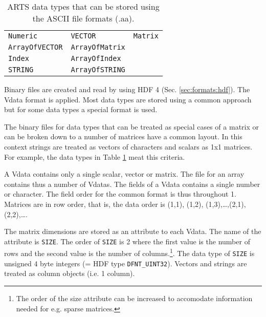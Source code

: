  \begin{table}[t]
  \begin{tabular}{p{4.5cm} p{4.5cm} p{4.5cm}}
   \verb|Numeric|        & \verb|VECTOR|         & \verb|Matrix|          \\
   \verb|ArrayOfVECTOR|  & \verb|ArrayOfMatrix|  &                        \\
   \verb|Index|          & \verb|ArrayOfIndex|  &                        \\
   \verb|STRING|          & \verb|ArrayOfSTRING|  &                        \\
  \end{tabular}
  \caption{ARTS data types that can be stored using the ASCII
           file formats (.aa).}
  \label{table:format:aa}
 \end{table}
 

 \label{sec:formats:file:binary}
  
 Binary files are created and read by using HDF 4 (Sec.
 \ref{sec:formats:hdf}). The Vdata format is applied. Most data types
 are stored using a common approach but for some data types a special 
 format is used.

 \label{sec:formats:file:binary:general}
 
 The binary files for data types that can be treated as special cases
 of a matrix or can be broken down to a number of matrices have a
 common layout. In this context strings are treated as vectors of
 characters and scalars as 1x1 matrices. For example, the data types
 in Table \ref{table:format:aa} meat this criteria.
 
 A Vdata contains only a single scalar, vector or matrix. The file for
 an array contains thus a number of Vdatas. The fields of a Vdata
 contains a single number or character. The field order for the common
 format is thus throughout 1. Matrices are in row order, that is, 
 the data order is (1,1), (1,2), (1,3),\dots,(2,1),(2,2),\dots.
 
 The matrix dimensions are stored as an attribute to each Vdata. The
 name of the attribute is \verb|SIZE|. The order of \verb|SIZE| is 2
 where the first value is the number of rows and the second value is
 the number of columns.\footnote{The order of the size attribute can
   be increased to accomodate information needed for e.g. sparse
   matrices.}. The data type of \verb|SIZE| is unsigned 4 byte
 integers (= HDF type \verb|DFNT_UINT32|). Vectors and strings are
 treated as column objects (i.e. 1 column).
 
